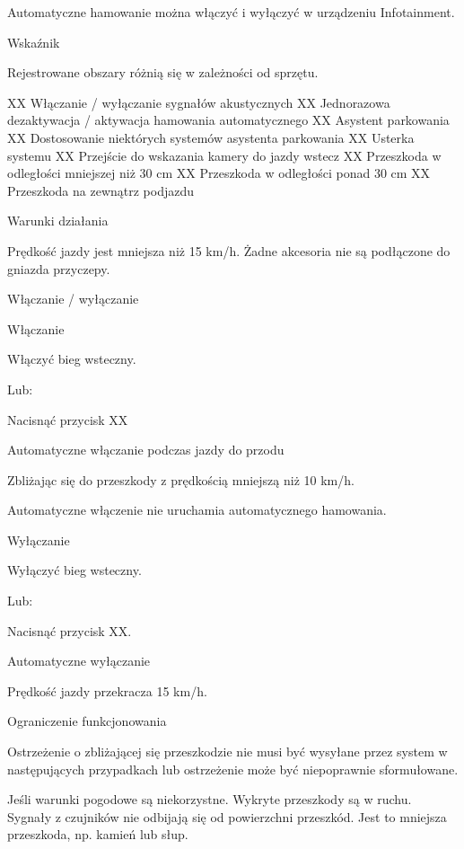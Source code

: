 Automatyczne hamowanie można włączyć i wyłączyć w urządzeniu Infotainment.

Wskaźnik

Rejestrowane obszary różnią się w zależności od sprzętu.

XX Włączanie / wyłączanie sygnałów akustycznych
XX Jednorazowa dezaktywacja / aktywacja hamowania automatycznego
XX Asystent parkowania
XX Dostosowanie niektórych systemów asystenta parkowania
XX Usterka systemu
XX Przejście do wskazania kamery do jazdy wstecz
XX Przeszkoda w odległości mniejszej niż 30 cm
XX Przeszkoda w odległości ponad 30 cm
XX Przeszkoda na zewnątrz podjazdu

Warunki działania
\begin{itemizeTick}
	\itemTick Prędkość jazdy jest mniejsza niż 15 km/h.
	\itemTick Żadne akcesoria nie są podłączone do gniazda przyczepy.
\end{itemizeTick}

Włączanie / wyłączanie

Włączanie
\begin{itemizeArrow}
	\itemArrow Włączyć bieg wsteczny.
\end{itemizeArrow}
Lub:
\begin{itemizeArrow}
	\itemArrow Nacisnąć przycisk XX
\end{itemizeArrow}

Automatyczne włączanie podczas jazdy do przodu

Zbliżając się do przeszkody z prędkością mniejszą niż 10 km/h.

Automatyczne włączenie nie uruchamia automatycznego hamowania.

Wyłączanie

\begin{itemizeArrow}
	\itemArrow Wyłączyć bieg wsteczny.
\end{itemizeArrow}
Lub:
\begin{itemizeArrow}
	\itemArrow Nacisnąć przycisk XX.
\end{itemizeArrow}

Automatyczne wyłączanie

Prędkość jazdy przekracza 15 km/h.

Ograniczenie funkcjonowania

Ostrzeżenie o zbliżającej się przeszkodzie nie musi być wysyłane przez system w następujących przypadkach lub ostrzeżenie może być niepoprawnie sformułowane.
\begin{itemizeTriangle}
	\itemTriangle Jeśli warunki pogodowe są niekorzystne.
	\itemTriangle Wykryte przeszkody są w ruchu.
	\itemTriangle Sygnały z czujników nie odbijają się od powierzchni przeszkód.
	\itemTriangle Jest to mniejsza przeszkoda, np. kamień lub słup.
\end{itemizeTriangle}

